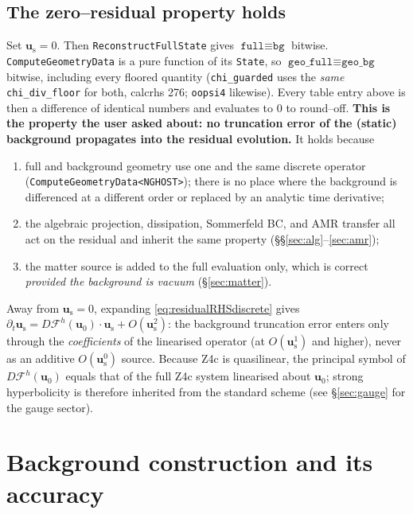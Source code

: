 \documentclass[11pt]{article}
\newcommand{\code}[1]{\texttt{#1}}
\newcommand{\bg}[1]{#1_{0}}
\newcommand{\res}[1]{#1_{\mathrm s}}
\newcommand{\Fop}{\mathcal{F}}            %
\newcommand{\Fnum}{\Fop^{h}}              %
\begin{document}
\subsection{The zero--residual property holds}
Set $\res{\bm u}=0$. Then \code{ReconstructFullState} gives
$\code{full}\equiv\code{bg}$ bitwise. \code{ComputeGeometryData} is a pure
function of its \code{State}, so $\code{geo\_full}\equiv\code{geo\_bg}$ bitwise,
including every floored quantity (\code{chi\_guarded} uses the \emph{same}
\code{chi\_div\_floor} for both, calcrhs 276; \code{oopsi4} likewise). Every
table entry above is then a difference of identical numbers and evaluates to
$0$ to round--off. \textbf{This is the property the user asked about: no
truncation error of the (static) background propagates into the residual
evolution.} It holds because

\begin{enumerate}[leftmargin=1.6em,itemsep=1pt]
\item full and background geometry use one and the same discrete operator
(\code{ComputeGeometryData<NGHOST>}); there is no place where the background
is differenced at a different order or replaced by an analytic time
derivative;
\item the algebraic projection, dissipation, Sommerfeld BC, and AMR transfer
all act on the residual and inherit the same property (\S\S\ref{sec:alg}--\ref{sec:amr});
\item the matter source is added to the full evaluation only, which is correct
\emph{provided the background is vacuum} (\S\ref{sec:matter}).
\end{enumerate}

Away from $\res{\bm u}=0$, expanding \eqref{eq:residualRHSdiscrete} gives
$\partial_t\res{\bm u} = D\Fnum(\bg{\bm u})\!\cdot\!\res{\bm u} +
O(\res{\bm u}^2)$: the background truncation error enters only through the
\emph{coefficients} of the linearised operator (at $O(\res{\bm u}^1)$ and
higher), never as an additive $O(\res{\bm u}^0)$ source. Because Z4c is
quasilinear, the principal symbol of $D\Fnum(\bg{\bm u})$ equals that of the
full Z4c system linearised about $\bg{\bm u}$; strong hyperbolicity is
therefore inherited from the standard scheme (see \S\ref{sec:gauge} for the
gauge sector).

\section{Background construction and its accuracy}
\label{sec:bgconstruct}
\end{document}
